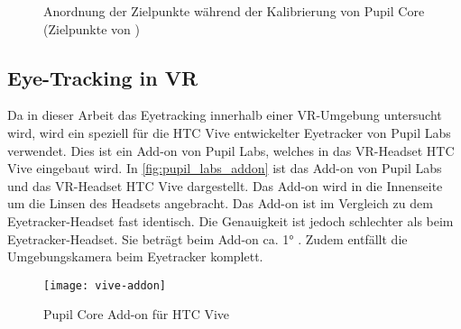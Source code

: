 \begin{figure}[!htbp]
	\centering
	\caption[Anordnung der Zielpunkte während der Kalibrierung von Pupil Core]{Anordnung der Zielpunkte während der Kalibrierung von Pupil Core (Zielpunkte von \cite{PupilLabsCalibMarker})}
	\label{fig:CalibrationMarker-2D}
\end{figure}

\subsection{Eye-Tracking in VR}
Da in dieser Arbeit das Eyetracking innerhalb einer \ac{VR}-Umgebung untersucht wird, wird ein speziell für die HTC Vive entwickelter Eyetracker von Pupil Labs verwendet. Dies ist ein Add-on von Pupil Labs, welches in das \ac{VR}-Headset HTC Vive eingebaut wird. In \autoref{fig:pupil_labs_addon} ist das Add-on von Pupil Labs und das \ac{VR}-Headset HTC Vive dargestellt. Das Add-on wird in die Innenseite um die Linsen des Headsets angebracht. Das Add-on ist im Vergleich zu dem Eyetracker-Headset fast identisch. Die Genauigkeit ist jedoch schlechter als beim Eyetracker-Headset. Sie beträgt beim Add-on ca. 1° \cite{PupilLabsAddOnSpecs}. Zudem entfällt die Umgebungskamera beim Eyetracker komplett. 

\begin{figure}[!htbp]
	\centering
	\texttt{[image: vive-addon]}
	\caption[Pupil Core Add-on für HTC Vive]{Pupil Core Add-on für HTC Vive \cite{PupilLabsAddOn}}
	\label{fig:pupil_labs_addon}
\end{figure}


